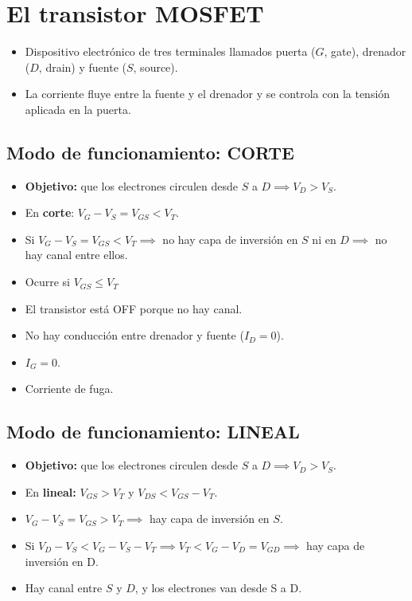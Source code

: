\documentclass[10pt,a4paper]{article}
\begin{document}
	\section{El transistor MOSFET}
	
	\begin{itemize}
		\item Dispositivo electrónico de tres terminales llamados puerta ($G$, gate), drenador ($D$, drain) y fuente ($S$, source).
		\item La corriente fluye entre la fuente y el drenador y se controla con la tensión aplicada en la puerta.
	\end{itemize}
	
	\subsection{Modo de funcionamiento: CORTE}
	
	\begin{itemize}
		\item \textbf{Objetivo: }que los electrones circulen desde $S$ a $D \implies V_D > V_S$.
		\item En \textbf{corte}: $V_G - V_S = V_{GS} < V_T$.
		\item Si $V_G - V_S = V_{GS} < V_T \implies$ no hay capa de inversión en $S$ ni en $D \implies$ no hay canal entre ellos.
	\end{itemize}
	\vspace{0cm}
	\begin{itemize}
		\item Ocurre si $V_{GS} \leq V_T$
		\item El transistor está OFF porque no hay canal.
		\item No hay conducción entre drenador y fuente ($I_D = 0$).
		\item $I_G = 0$.
		\item Corriente de fuga.
	\end{itemize}
	
	\subsection{Modo de funcionamiento: LINEAL}
	
	\begin{itemize}
		\item \textbf{Objetivo: }que los electrones circulen desde $S$ a $D \implies V_D > V_S$.
		\item En \textbf{lineal: }$V_{GS} > V_T$ y $V_{DS} < V_{GS} - V_T$.
		\item $V_G - V_S = V_{GS} > V_T \implies$ hay capa de inversión en $S$.
		\item Si $V_D - V_S < V_G - V_S - V_T \implies V_T < V_G - V_D = V_{GD} \implies$ hay capa de inversión en D.
		\item Hay canal entre $S$ y $D$, y los electrones van desde S a D.
	\end{itemize}
	
\end{document}
